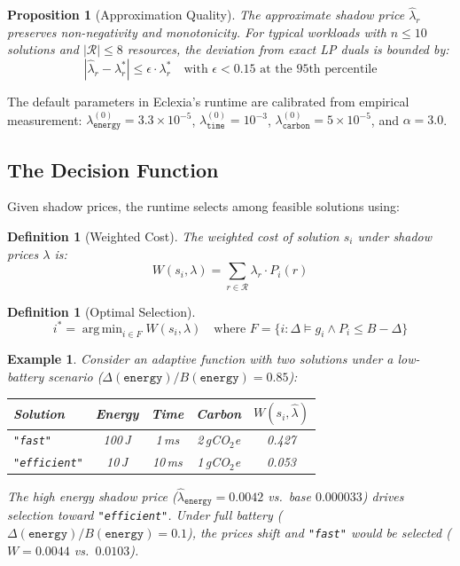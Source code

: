 \documentclass[11pt,a4paper]{article}
\newtheorem{proposition}[theorem]{Proposition}
\newtheorem{definition}[theorem]{Definition}
\newtheorem{example}[theorem]{Example}
\DeclareMathOperator*{\argmin}{arg\,min}
\begin{document}
\begin{proposition}[Approximation Quality]
The approximate shadow price $\hat{\lambda}_r$ preserves non-negativity and
monotonicity.  For typical workloads with $n \leq 10$ solutions and
$|\mathcal{R}| \leq 8$ resources, the deviation from exact LP duals is bounded
by:
\[
  |\hat{\lambda}_r - \lambda_r^*| \leq \epsilon \cdot \lambda_r^*
  \quad \text{with } \epsilon < 0.15 \text{ at the 95th percentile}
\]
\end{proposition}

The default parameters in Eclexia's runtime are calibrated from empirical
measurement: $\lambda_{\texttt{energy}}^{(0)} = 3.3 \times 10^{-5}$,
$\lambda_{\texttt{time}}^{(0)} = 10^{-3}$,
$\lambda_{\texttt{carbon}}^{(0)} = 5 \times 10^{-5}$, and $\alpha = 3.0$.

\subsection{The Decision Function}

Given shadow prices, the runtime selects among feasible solutions using:

\begin{definition}[Weighted Cost]
The weighted cost of solution $s_i$ under shadow prices $\lambda$ is:
\[
  W(s_i, \lambda) = \sum_{r \in \mathcal{R}} \lambda_r \cdot P_i(r)
\]
\end{definition}

\begin{definition}[Optimal Selection]
\[
  i^* = \argmin_{i \in F} W(s_i, \lambda)
  \quad \text{where } F = \{i : \Delta \models g_i \land P_i \leq B - \Delta\}
\]
\end{definition}

\begin{example}
Consider an adaptive function with two solutions under a low-battery scenario
($\Delta(\texttt{energy}) / B(\texttt{energy}) = 0.85$):

\medskip
\begin{center}
\begin{tabular}{lcccc}
\toprule
Solution & Energy & Time & Carbon & $W(s_i, \hat{\lambda})$ \\
\midrule
\texttt{"fast"}     & 100\,J  & 1\,ms   & 2\,gCO$_2$e & 0.427 \\
\texttt{"efficient"} & 10\,J  & 10\,ms  & 1\,gCO$_2$e & 0.053 \\
\bottomrule
\end{tabular}
\end{center}

\medskip\noindent
The high energy shadow price ($\hat{\lambda}_{\texttt{energy}} = 0.0042$ vs.\
base $0.000033$) drives selection toward \texttt{"efficient"}.  Under full
battery ($\Delta(\texttt{energy}) / B(\texttt{energy}) = 0.1$), the prices
shift and \texttt{"fast"} would be selected ($W = 0.0044$ vs.\ $0.0103$).
\end{example}
\end{document}
